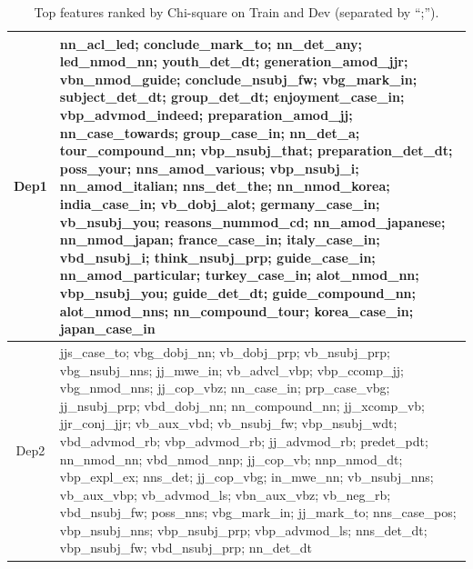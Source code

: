 \documentclass[11pt,letterpaper]{article}
\begin{document}
\begin{table}[t]
\begin{tabular}{|c|p{138mm}|}
Dep1 & nn\_acl\_led; conclude\_mark\_to; nn\_det\_any; led\_nmod\_nn; youth\_det\_dt; generation\_amod\_jjr; vbn\_nmod\_guide; conclude\_nsubj\_fw; vbg\_mark\_in; subject\_det\_dt; group\_det\_dt; enjoyment\_case\_in; vbp\_advmod\_indeed; preparation\_amod\_jj; nn\_case\_towards; group\_case\_in; nn\_det\_a; tour\_compound\_nn; vbp\_nsubj\_that; preparation\_det\_dt; poss\_your; nns\_amod\_various; vbp\_nsubj\_i; nn\_amod\_italian; nns\_det\_the; nn\_nmod\_korea; india\_case\_in; vb\_dobj\_alot; germany\_case\_in; vb\_nsubj\_you; reasons\_nummod\_cd; nn\_amod\_japanese; nn\_nmod\_japan; france\_case\_in; italy\_case\_in; vbd\_nsubj\_i; think\_nsubj\_prp; guide\_case\_in; nn\_amod\_particular; turkey\_case\_in; alot\_nmod\_nn; vbp\_nsubj\_you; guide\_det\_dt; guide\_compound\_nn; alot\_nmod\_nns; nn\_compound\_tour; korea\_case\_in; japan\_case\_in \\
\hline
Dep2 & jjs\_case\_to; vbg\_dobj\_nn; vb\_dobj\_prp; vb\_nsubj\_prp; vbg\_nsubj\_nns; jj\_mwe\_in; vb\_advcl\_vbp; vbp\_ccomp\_jj; vbg\_nmod\_nns; jj\_cop\_vbz; nn\_case\_in; prp\_case\_vbg; jj\_nsubj\_prp; vbd\_dobj\_nn; nn\_compound\_nn; jj\_xcomp\_vb; jjr\_conj\_jjr; vb\_aux\_vbd; vb\_nsubj\_fw; vbp\_nsubj\_wdt; vbd\_advmod\_rb; vbp\_advmod\_rb; jj\_advmod\_rb; predet\_pdt; nn\_nmod\_nn; vbd\_nmod\_nnp; jj\_cop\_vb; nnp\_nmod\_dt; vbp\_expl\_ex; nns\_det; jj\_cop\_vbg; in\_mwe\_nn; vb\_nsubj\_nns; vb\_aux\_vbp; vb\_advmod\_ls; vbn\_aux\_vbz; vb\_neg\_rb; vbd\_nsubj\_fw; poss\_nns; vbg\_mark\_in; jj\_mark\_to; nns\_case\_pos; vbp\_nsubj\_nns; vbp\_nsubj\_prp; vbp\_advmod\_ls; nns\_det\_dt; vbp\_nsubj\_fw; vbd\_nsubj\_prp; nn\_det\_dt \\
\hline
\end{tabular}
\caption{Top features ranked by Chi-square on Train and Dev (separated by ``;'').}
\label{tab:results-4}
\end{table}


\cleardoublepage


\end{document}

